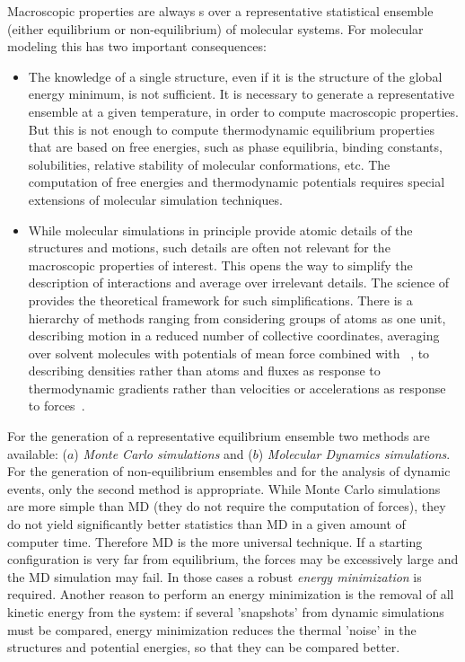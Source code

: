 Macroscopic properties are always s over a 
representative statistical ensemble (either equilibrium or 
non-equilibrium) of molecular systems. For molecular modeling this has 
two important consequences:
\begin{itemize}
\item   The knowledge of a single structure, even if it is the structure 
        of the global energy minimum, is not sufficient. It is necessary to 
        generate a representative ensemble at a given temperature, in order to 
        compute macroscopic properties. But this is not enough to compute 
        thermodynamic equilibrium properties that are based on free energies, 
        such as phase equilibria, binding constants, solubilities,  relative 
        stability of molecular conformations, etc. The computation of free 
        energies and thermodynamic potentials requires special extensions of 
        molecular simulation techniques.
\item   While molecular simulations in principle provide atomic details 
        of the structures and motions, such details are often not relevant for 
        the macroscopic properties of interest. This opens the way to simplify 
        the description of interactions and average over irrelevant details. 
        The science of  
        provides the theoretical framework 
        for such simplifications. There is a hierarchy of methods ranging from 
        considering groups of atoms as one unit, describing motion in a 
        reduced 
        number of collective coordinates, averaging over solvent molecules 
        with 
        potentials of mean force combined with 
        ~\cite{Gunsteren90}, to {\em 
        } 
        describing densities rather than atoms and fluxes 
        as response to thermodynamic gradients rather than velocities or 
        accelerations as response to forces~\cite{Fraaije93}.
\end{itemize}

For the generation of a representative equilibrium ensemble two methods 
are available: ($a$) {\em Monte Carlo simulations} and ($b$) {\em Molecular 
Dynamics simulations}. For the generation of non-equilibrium ensembles 
and for the analysis of dynamic events, only the second method is 
appropriate. While Monte Carlo simulations are more simple than MD (they 
do not require the computation of forces), they do not yield 
significantly better statistics than MD in a given amount of computer time. 
Therefore MD is the more universal technique. If a starting 
configuration is very far from equilibrium, the forces may be 
excessively large and the MD simulation may fail. In those cases a 
robust {\em energy minimization} is required. Another reason to perform 
an energy minimization is the removal of all kinetic energy from the 
system: if several 'snapshots' from dynamic simulations must be compared, 
energy minimization reduces the thermal 'noise' in the structures and  
potential energies,  so that they can be compared better.

